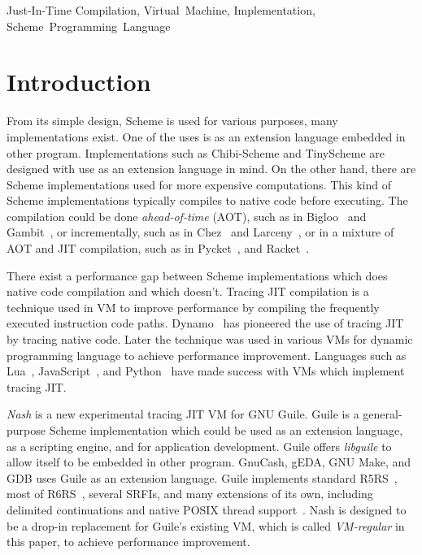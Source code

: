 \documentclass[preprint, 10pt]{sigplanconf}
\begin{document}


\keywords{} Just-In-Time Compilation, Virtual~Machine, Implementation,
Scheme~Programming~Language

\section{Introduction}

From its simple design, Scheme is used for various purposes, many
implementations exist. One of the uses is as an extension language embedded in
other program. Implementations such as Chibi-Scheme and TinyScheme are designed
with use as an extension language in mind. On the other hand, there are Scheme
implementations used for more expensive computations. This kind of Scheme
implementations typically compiles to native code before executing. The
compilation could be done \textit{ahead-of-time} (AOT), such as in
Bigloo~\cite{serrano1995bigloo} and Gambit~\cite{feeley1998gambit}, or
incrementally, such as in Chez~\cite{dybvig2006development} and
Larceny~\cite{hansen1992impact}, or in a mixture of AOT and JIT compilation,
such as in Pycket~\cite{bauman2015pycket}, and Racket~\cite{flatt2013racket}.

There exist a performance gap between Scheme implementations which does native
code compilation and which doesn't. Tracing JIT compilation is a technique used
in VM to improve performance by compiling the frequently executed instruction
code paths. Dynamo~\cite{bala2000dynamo} has pioneered the use of tracing JIT by
tracing native code. Later the technique was used in various VMs for dynamic
programming language to achieve performance improvement. Languages such as
Lua~\cite{pall2016luajit}, JavaScript~\cite{gal2009trace}, and
Python~\cite{bolz2009tracing} have made success with VMs which implement tracing
JIT.\@

\textit{Nash} is a new experimental tracing JIT VM for GNU Guile. Guile is a
general-purpose Scheme implementation which could be used as an extension
language, as a scripting engine, and for application development. Guile offers
\textit{libguile} to allow itself to be embedded in other program. GnuCash,
gEDA, GNU Make, and GDB uses Guile as an extension language. Guile implements
standard R5RS~\cite{abelson1998revised5}, most of
R6RS~\cite{sperber2010revised}, several SRFIs, and many extensions of its own,
including delimited continuations and native POSIX thread
support~\cite{Galassi02guilereference}. Nash is designed to be a drop-in
replacement for Guile's existing VM, which is called \textit{VM-regular} in this
paper, to achieve performance improvement.
\end{document}
